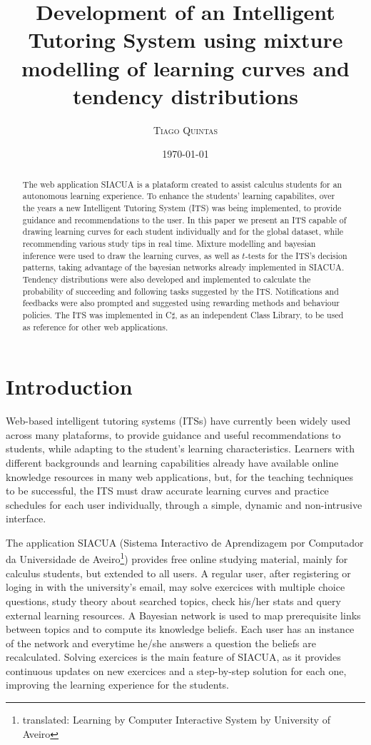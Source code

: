 \documentclass{article}
\title{
\textbf{\huge{Development of an Intelligent Tutoring System using mixture modelling of learning curves and tendency distributions}}
}
\author{\Large{\textsc{Tiago Quintas}}}
\date{\today}
\newcommand{\0}{\mathbbold{0}}
\newcommand{\1}{\mathds{1}}
\newcommand{\2}{\mathbbold{2}}
\begin{document}
\maketitle
\begin{abstract}
    The web application SIACUA is a plataform created to assist calculus students for an autonomous learning experience.
    To enhance the students' learning capabilites, over the years a new Intelligent Tutoring System (ITS) was being implemented, to provide guidance and recommendations to the user.
    In this paper we present an ITS capable of drawing learning curves for each student individually and for the global dataset, while recommending various study tips in real time.
    Mixture modelling and bayesian inference were used to draw the learning curves, as well as $t$-tests for the ITS's decision patterns, taking advantage of the bayesian networks already implemented in SIACUA.
    Tendency distributions were also developed and implemented to calculate the probability of succeeding and following tasks suggested by the ITS.
    Notifications and feedbacks were also prompted and suggested using rewarding methods and behaviour policies. The ITS was implemented in C$\sharp$, as an independent Class Library, to be used as reference for other web applications.
\end{abstract}
\section{Introduction}
    Web-based intelligent tutoring systems (ITSs) have currently been widely used across many plataforms, to provide guidance and useful recommendations to students, while adapting to the student's learning characteristics.
    Learners with different backgrounds and learning capabilities already have available online knowledge resources in many web applications, but, for the teaching techniques to be successful, the ITS must draw accurate learning curves and practice schedules for each user individually, through a simple, dynamic and non-intrusive interface.

    The application SIACUA (Sistema Interactivo de Aprendizagem por Computador da Universidade de Aveiro\footnote{translated: Learning by Computer Interactive System by University of Aveiro}) provides free online studying material, mainly for calculus students, but extended to all users.
    A regular user, after registering or loging in with the university's email, may solve exercices with multiple choice questions, study theory about searched topics, check his/her stats and query external learning resources.
    A Bayesian network is used to map prerequisite links between topics and to compute its knowledge beliefs. Each user has an instance of the network and everytime he/she answers a question the beliefs are recalculated.
    Solving exercices is the main feature of SIACUA, as it provides continuous updates on new exercices and a step-by-step solution for each one, improving the learning experience for the students.
\end{document}
